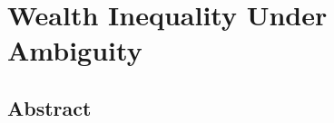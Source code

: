\chapter{Wealth Inequality Under Ambiguity}
\label{chap:wealth-ambiguity}

\begingroup
\singlespacing
\section*{Abstract}

\endgroup








